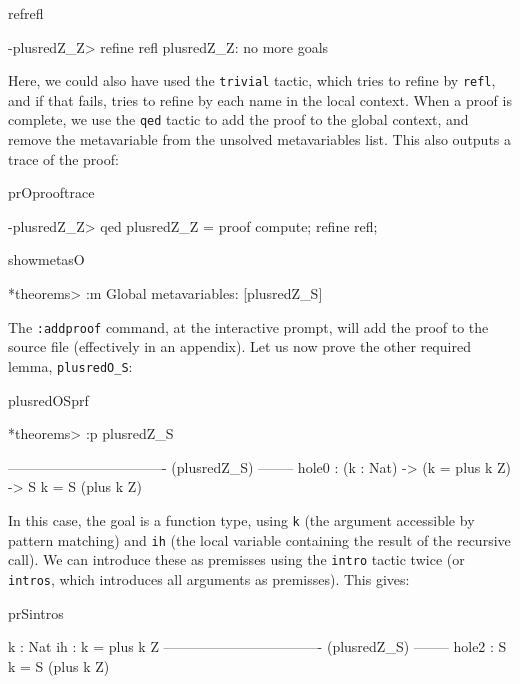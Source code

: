 \begin{SaveVerbatim}{refrefl}

-plusredZ_Z> refine refl
plusredZ_Z: no more goals

\end{SaveVerbatim}

\noindent
Here, we could also have used the \texttt{trivial} tactic, which tries to refine by
\texttt{refl}, and if that fails, tries to refine by each name in the local context.
When a proof is complete, we use the \texttt{qed} tactic to add the proof to the
global context, and remove the metavariable from the unsolved metavariables list.
This also outputs a trace of the proof:

\begin{SaveVerbatim}{prOprooftrace}

-plusredZ_Z> qed
plusredZ_Z = proof {
    compute;
    refine refl;
}

\end{SaveVerbatim}

\begin{SaveVerbatim}{showmetasO}

*theorems> :m 
Global metavariables:
        [plusredZ_S]

\end{SaveVerbatim}

\noindent
The \texttt{:addproof} command, at the interactive prompt, will add the proof to
the source file (effectively in an appendix).
Let us now prove the other required lemma, \texttt{plusredO\_S}:

\begin{SaveVerbatim}{plusredOSprf}

*theorems> :p plusredZ_S

---------------------------------- (plusredZ_S) --------
{hole0} : (k : Nat) -> (k = plus k Z) -> S k = S (plus k Z)

\end{SaveVerbatim}

\noindent
In this case, the goal is a function type, using \texttt{k} (the argument accessible by
pattern matching) and \texttt{ih} (the local variable containing the result of
the recursive call). We can introduce these as premisses using the \texttt{intro} tactic
twice (or \texttt{intros}, which introduces all arguments as premisses). This gives:

\begin{SaveVerbatim}{prSintros}

  k : Nat
  ih : k = plus k Z
---------------------------------- (plusredZ_S) --------
{hole2} : S k = S (plus k Z)

\end{SaveVerbatim}

